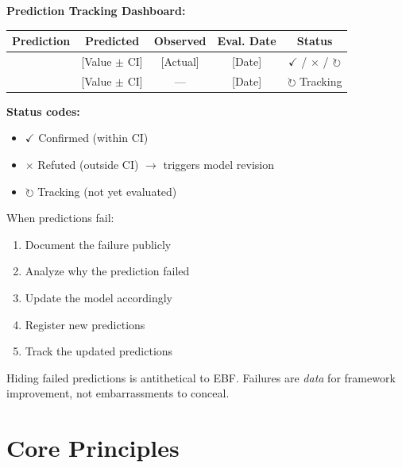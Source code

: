 \textbf{Prediction Tracking Dashboard:}
\begin{center}
\small
\begin{tabular}{@{}lcccc@{}}
\toprule
\textbf{Prediction} & \textbf{Predicted} & \textbf{Observed} & \textbf{Eval. Date} & \textbf{Status} \\
\midrule
[Prediction 1] & [Value $\pm$ CI] & [Actual] & [Date] & $\checkmark$ / $\times$ / $\circlearrowright$ \\
[Prediction 2] & [Value $\pm$ CI] & --- & [Date] & $\circlearrowright$ Tracking \\
\bottomrule
\end{tabular}
\end{center}

\textbf{Status codes:}
\begin{itemize}[nosep]
    \item $\checkmark$ Confirmed (within CI)
    \item $\times$ Refuted (outside CI) $\to$ triggers model revision
    \item $\circlearrowright$ Tracking (not yet evaluated)
\end{itemize}

\begin{tcolorbox}[colback=red!5!white, colframe=red!75!black,
    title=\textbf{Critical Principle: Refutation $\to$ Revision, Not Concealment}]

When predictions fail:
\begin{enumerate}[nosep]
    \item Document the failure publicly
    \item Analyze why the prediction failed
    \item Update the model accordingly
    \item Register new predictions
    \item Track the updated predictions
\end{enumerate}

Hiding failed predictions is antithetical to EBF. Failures are \textit{data}
for framework improvement, not embarrassments to conceal.

\end{tcolorbox}



\section{Core Principles}
\label{sec:apply-principles}

